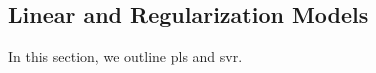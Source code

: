 \subsection{Linear and Regularization Models}
In this section, we outline \gls{pls} and \gls{svr}.


